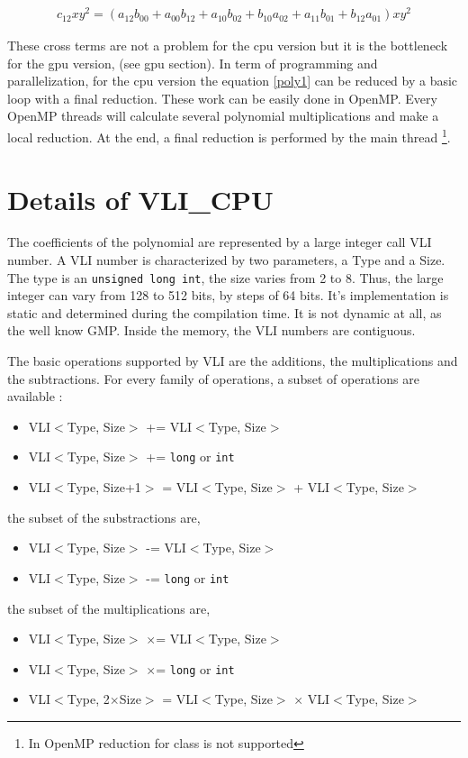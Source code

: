 \documentclass[11pt]{amsart}
\begin{document}
\begin{eqnarray}
c_{12}xy^2 = \left(a_{12}b_{00}  +  a_{00}b_{12} + a_{10}b_{02}   + b_{10}a_{02}  +  a_{11}b_{01} + b_{12}a_{01}  \right)xy^2
\end{eqnarray}

These cross terms are not a problem for the cpu version but it is the bottleneck for the gpu version, (see gpu section). In term of  programming and parallelization, 
for the cpu version the equation  \ref{poly1} can be reduced by a basic loop with a final reduction. These work can be easily done in OpenMP. Every OpenMP threads
will calculate several  polynomial multiplications and make a local reduction. At the end, a final reduction is performed  by the main thread \footnote{In OpenMP reduction for class is not supported}. 

\section*{Details of VLI\_CPU}

The coefficients of the polynomial are represented by a large integer call VLI number.  A VLI number is characterized by two parameters, a Type and a Size.
 The type is an \texttt{unsigned long int},  the size varies from 2 to 8. Thus, the large integer can vary from 128 to 512 bits, by steps of 64 bits. It's implementation is static and determined during the compilation time.
 It is not dynamic at all, as the well know GMP. Inside the memory, the VLI numbers are  contiguous. 
 
The basic operations supported by VLI are the additions, the multiplications and the subtractions. For every family of operations, a subset of operations are available :
\begin{itemize}
\item VLI$<$Type, Size$>$ += VLI$<$Type, Size$>$
\item VLI$<$Type, Size$>$ += \texttt{long} or \texttt{int}
\item VLI$<$Type, Size+1$>$ = VLI$<$Type, Size$>$ + VLI$<$Type, Size$>$
\end{itemize}
the subset of the substractions are,
\begin{itemize}
\item VLI$<$Type, Size$>$ -= VLI$<$Type, Size$>$
\item VLI$<$Type, Size$>$ -= \texttt{long} or \texttt{int}
\end{itemize}
the subset of the  multiplications are,
\begin{itemize}
\item VLI$<$Type, Size$>$  $\times$= VLI$<$Type, Size$>$
\item VLI$<$Type, Size$>$  $\times$= \texttt{long} or \texttt{int}
\item VLI$<$Type, 2$\times$Size$>$ = VLI$<$Type, Size$>$ $\times$ VLI$<$Type, Size$>$
\end{itemize}
\end{document}
